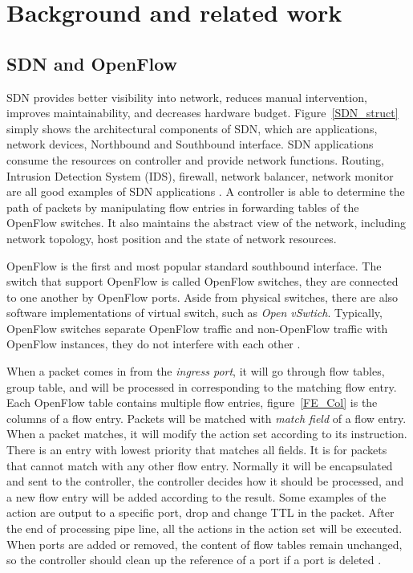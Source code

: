 \chapter{Background and related work}
\section{SDN and OpenFlow}
SDN provides better visibility into network, reduces manual intervention, improves maintainability, and decreases hardware budget. Figure~\ref{SDN_struct} simply shows the architectural components of SDN, which are applications, network devices, Northbound and Southbound interface. SDN applications consume the resources on controller and provide network functions. Routing, Intrusion Detection System (IDS), firewall, network balancer, network monitor are all good examples of SDN applications \cite{SPYFGT13}. A controller is able to determine the path of packets by manipulating flow entries in forwarding tables of the OpenFlow switches. It also maintains the abstract view of the network, including network topology, host position and the state of network resources.

OpenFlow is the first and most popular standard southbound interface. The switch that support OpenFlow is called OpenFlow switches, they are connected to one another by OpenFlow ports. Aside from physical switches, there are also software implementations of virtual switch, such as \textit{Open vSwtich}. Typically, OpenFlow switches separate OpenFlow traffic and non-OpenFlow traffic with OpenFlow instances, they do not interfere with each other \cite{HP_SPEC}.

When a packet comes in from the \textit{ingress port}, it will go through flow tables, group table, and will be processed in corresponding to the matching flow entry. Each OpenFlow table contains multiple flow entries, figure~\ref{FE_Col} is the columns of a flow entry. Packets will be matched with \textit{match field} of a flow entry. When a packet matches, it will modify the action set according to its instruction. There is an entry with lowest priority that matches all fields. It is for packets that cannot match with any other flow entry. Normally it will be encapsulated and sent to the controller, the controller decides how it should be processed, and a new flow entry will be added according to the result. Some examples of the action are output to a specific port, drop and change TTL in the packet. After the end of processing pipe line, all the actions in the action set will be executed. When ports are added or removed, the content of flow tables remain unchanged, so the controller should clean up the reference of a port if a port is deleted \cite{OF_SPEC}.

